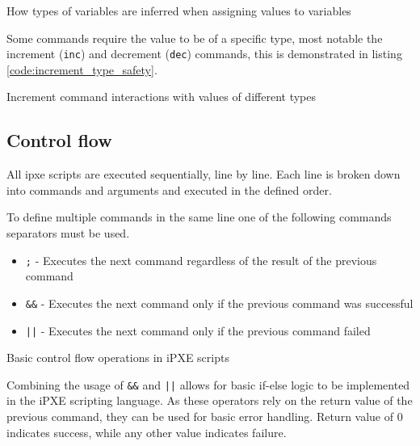 \documentclass[../main.tex]{subfiles}
\begin{document}
\begin{listing}[H]
  \caption{How types of variables are inferred when assigning values to variables}
  \label{code:variable_types_when_assigning}
\end{listing}

Some commands require the value to be of a specific type, most notable the increment (\texttt{inc}) and decrement (\texttt{dec}) commands, this is demonstrated in listing \ref{code:increment_type_safety}.

\begin{listing}[H]
  \caption{Increment command interactions with values of different types}
  \label{code:increment_type_safety}
\end{listing}

\subsection{Control flow}
All ipxe scripts are executed sequentially, line by line.
Each line is broken down into commands and arguments and executed in the defined order.

To define multiple commands in the same line one of the following commands separators must be used.

\begin{itemize}
  \item \texttt{;}    - Executes the next command regardless of the result of the previous command
  \item \texttt{\&\&} - Executes the next command only if the previous command was successful
  \item \texttt{||}   - Executes the next command only if the previous command failed
\end{itemize}

\begin{listing}[H]
  \caption{Basic control flow operations in iPXE scripts}
\end{listing}

Combining the usage of \texttt{\&\&} and \texttt{||} allows for basic
if-else logic to be implemented in the iPXE scripting language.
As these operators rely on the return value of the previous command,
they can be used for basic error handling. Return value of 0 indicates success,
while any other value indicates failure.
\end{document}
